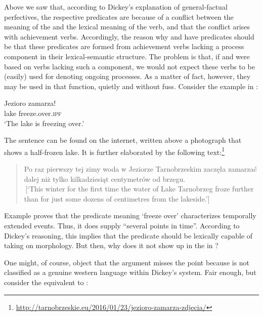 \documentclass[output=paper,modfonts,newtxmath,hidelinks]{langscibook}
\begin{document}
\noindent Above we saw that, according to Dickey's explanation of general-factual perfectives, 
the respective predicates are  because of a conflict between 
the meaning of the  and the lexical meaning of the verb, and that the conflict arises with achievement verbs. 
Accordingly, the reason why  and  have  predicates should be that these predicates are formed from 
achievement verbs lacking a process component in their lexical-semantic structure. 
The problem is that, if  and  were based on verbs lacking such a component, 
we would not expect these verbs to be (easily) used for denoting ongoing processes. As a matter of fact, however,
they may be used in that function, quietly and without fuss. Consider the  example in :

\begin{exe}
\ex\label{13:jezioro}
\gll Jezioro zamarza! \\
lake freeze.over.\textsc{ipf}\\
\glt `The lake is freezing over.'
\end{exe}

\noindent The sentence can be found on the internet, written above a photograph that shows a half-frozen lake. 
It is further elaborated by the following text:\footnote{\url{http://tarnobrzeskie.eu/2016/01/23/jezioro-zamarza-zdjecia/}} 

\begin{quote}
 Po raz pierwszy tej zimy woda w Jeziorze Tarnobrzeskim zacz\k e\l{a} 
zamarza\'c dalej ni\.z tylko kilkadziesi\k at centymetr\'ow od brzegu.\\
$\,$[`This winter for the first time the water of Lake Tarnobrzeg froze further than for just some dozens of centimetres from the lakeside.'] 
\end{quote}

\noindent Example  proves that the  predicate meaning `freeze over' characterizes 
temporally extended events. 
Thus, it does supply ``several points in time''. According to Dickey's reasoning, this implies that the predicate should be lexically capable 
of taking on  morphology. But then, why does it not show up in the  in ?

One might, of course, object that the argument misses the point because  is not classified as a genuine western language within Dickey's system. 
Fair enough, but consider the  equivalent to :
\end{document}

